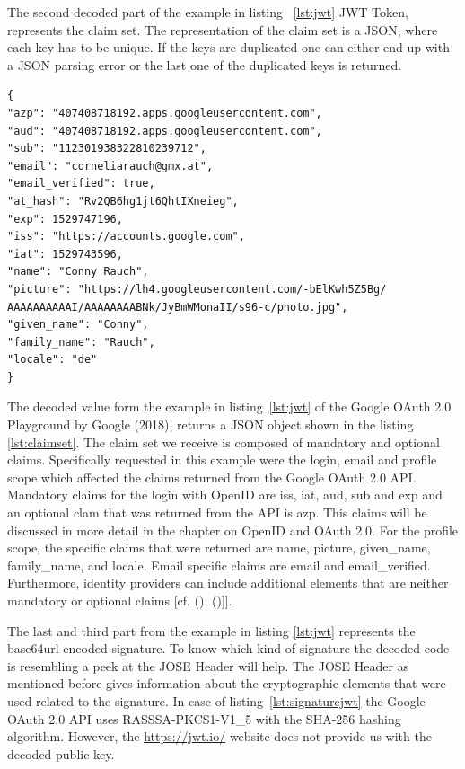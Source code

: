 The second decoded part of the example in listing ~\ref{lst:jwt} JWT Token, represents the claim set. The representation of the claim set is a JSON, where each key has to be unique. If the keys are duplicated one can either end up with a JSON parsing error or the last one of the duplicated keys is returned. 

\begin{lstlisting}
{
"azp": "407408718192.apps.googleusercontent.com",
"aud": "407408718192.apps.googleusercontent.com",
"sub": "112301938322810239712",
"email": "corneliarauch@gmx.at",
"email_verified": true,
"at_hash": "Rv2QB6hg1jt6QhtIXneieg",
"exp": 1529747196,
"iss": "https://accounts.google.com",
"iat": 1529743596,
"name": "Conny Rauch",
"picture": "https://lh4.googleusercontent.com/-bElKwh5Z5Bg/
AAAAAAAAAAI/AAAAAAAABNk/JyBmWMonaII/s96-c/photo.jpg",
"given_name": "Conny",
"family_name": "Rauch",
"locale": "de"
}
\end{lstlisting}

The decoded value form the example in listing~\ref{lst:jwt} of the Google OAuth 2.0 Playground  by Google (2018), returns a JSON object shown in the listing \ref{lst:claimset}. The claim set we receive is composed of mandatory and optional claims. Specifically requested in this example were the login, email and profile scope which affected the claims returned from the Google OAuth 2.0 API. Mandatory claims for the login with OpenID are iss, iat, aud, sub and exp and an optional clam that was returned from the API is azp. This claims will be discussed in more detail in the chapter on OpenID and OAuth 2.0. For the profile scope, the specific claims that were returned are name, picture, given\_name, family\_name, and locale. Email specific claims are email and email\_verified. Furthermore, identity providers can include additional elements that are neither mandatory or optional claims [cf. ({\cite{Google:2018:OAuthPlayground}), (\cite{Siriwardena:JWTJWSJWE:2016})]}].

The last and third part from the example in listing \ref{lst:jwt}  represents the base64url-encoded signature. To know which kind of signature the decoded code is resembling a peek at the JOSE Header will help. The JOSE Header as mentioned before gives information about the cryptographic elements that were used related to the signature. In case of listing~\ref{lst:signaturejwt} the Google OAuth 2.0 API uses RASSSA-PKCS1-V1\_5 with the SHA-256 hashing algorithm. However, the \href{https://jwt.io/} {https://jwt.io/} website does not provide us with the decoded public key. 

